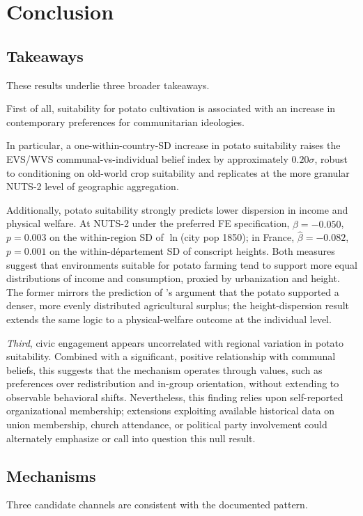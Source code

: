 \documentclass[11pt]{article}
\begin{document}
\FloatBarrier

\section{Conclusion}
\subsection{Takeaways}
These results underlie three broader takeaways.

First of all, suitability for potato cultivation is associated with an increase in contemporary preferences for communitarian ideologies.

In particular, a one-within-country-SD increase in potato suitability raises the EVS/WVS communal-vs-individual belief index by approximately $0.20\sigma$, robust to conditioning on old-world crop suitability and replicates at the more granular NUTS-2 level of geographic aggregation.

Additionally, potato suitability strongly predicts lower dispersion in income and physical welfare. At NUTS-2 under the preferred FE specification, $\hat\beta = -0.050$, $p = 0.003$ on the within-region SD of $\ln$(city pop 1850); in France, $\hat\beta = -0.082$, $p = 0.001$ on the within-département SD of conscript heights. Both measures suggest that environments suitable for potato farming tend to support more equal distributions of income and consumption, proxied by urbanization and height. The former mirrors the prediction of \citet{NunnQian2011}'s argument that the potato supported a denser, more evenly distributed agricultural surplus; the height-dispersion result extends the same logic to a physical-welfare outcome at the individual level.

\textit{Third}, civic engagement appears uncorrelated with regional variation in potato suitability. Combined with a significant, positive relationship with communal beliefs, this suggests that the mechanism operates through values, such as preferences over redistribution and in-group orientation, without extending to observable behavioral shifts. Nevertheless, this finding relies upon self-reported organizational membership; extensions exploiting available historical data on union membership, church attendance, or political party involvement could alternately emphasize or call into question this null result.

\subsection{Mechanisms}
Three candidate channels are consistent with the documented pattern.
\end{document}
